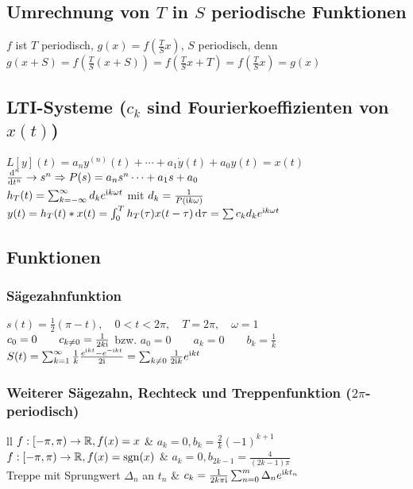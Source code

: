 \documentclass[german,color,5pt]{latex4ei/latex4ei_fs}
\begin{document}
\begin{sectionbox}
	\subsection{Umrechnung von $T$ in $S$ periodische Funktionen}
	$f$ ist $T$ periodisch, $g(x) = f\left( \frac{T}{S} x \right)$, $S$ periodisch, denn
	$g(x+S) = f\left( \frac{T}{S} (x+S) \right) = f\left( \frac{T}{S} x + T \right) = f\left( \frac{T}{S} x \right) = g(x)$\\
\end{sectionbox}

\begin{sectionbox}
	\subsection{LTI-Systeme ($c_k$ sind Fourierkoeffizienten von $x(t)$) }
	$L[y](t) = a_n y^{(n)}(t) + \cdots + a_1 \dot{y}(t) + a_0 y(t) = x(t)$\\
	$\frac{\diff^n}{\diff t^n} \ra s^n \Ra P(s) = a_n s^n \cdots + a_1 s + a_0$\\
	$h_T(t) = \sum_{k=-\infty}^{\infty}d_k e^{\mathrm{i} k \omega t}$ mit $d_k = \frac{1}{P(\mathrm{i} k \omega)}$\\
	$y(t) = h_T(t)*x(t) = \int_0^T h_T(\tau) x(t - \tau) \diff \tau = \sum c_k d_k e^{\i k\omega t}$
	
\end{sectionbox}

\begin{sectionbox}
	\subsection{Funktionen}
	\subsubsection{Sägezahnfunktion}
	$s(t) = \frac{1}{2}(\pi - t), \quad 0 < t < 2 \pi, \quad T = 2 \pi, \quad \omega = 1$\\
	$c_0 = 0 \qquad c_{k\ne 0} = \frac{1}{2k \mathrm{i}}$ \quad bzw. \quad $ a_0 = 0 \qquad a_k=0 \qquad b_k=\frac{1}{k}$\\
	$S(t) = \sum_{k=1}^{\infty}\frac{1}{k}\frac{e^{\mathrm{i} k t} - e^{-\mathrm{i} k t}}{2 \mathrm{i}} = \sum_{k\ne 0}\frac{1}{2\mathrm{i} k}e^{\mathrm{i} k t}$
	\subsubsection{Weiterer Sägezahn, Rechteck und Treppenfunktion ($2\pi$-periodisch)}
	\begin{tablebox}{ll}
		$f:[-\pi,\pi) \rightarrow \mathbb{R}, f(x)=x$ & $a_k=0, b_k=\frac{2}{k}(-1)^{k+1}$ \\
		$f:[-\pi,\pi) \rightarrow \mathbb{R}, f(x)=\operatorname{sgn}(x)$ & $a_k=0, b_{2k-1}=\frac{4}{(2k-1)\pi}$ \\
		Treppe mit Sprungwert $\Delta_n$ an $t_n$ & $c_k=\frac{1}{2k\pi\mathrm{i}}\sum_{n=0}^{m}\Delta_n e^{\mathrm{i} k t_n}$
	\end{tablebox}
\end{sectionbox}
\end{document}
